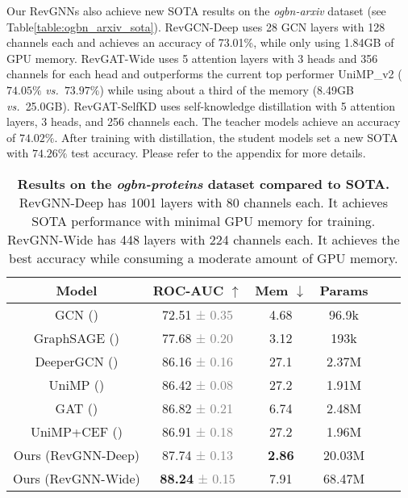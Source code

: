 \documentclass{article}
\newcommand{\vs}{\emph{vs.~}}
\newcommand{\tblLabel}{Table\xspace}
\begin{document}
Our RevGNNs also achieve new SOTA results on the \emph{ogbn-arxiv} dataset (see \tblLabel \ref{table:ogbn_arxiv_sota}). RevGCN-Deep uses 28 GCN \citep{kipf2017semi} layers with 128 channels each and achieves an accuracy of 73.01\%, while  only using 1.84GB of GPU memory.
RevGAT-Wide uses 5 attention layers with 3 heads and 356 channels for each head and outperforms the current top performer UniMP\_v2 \citep{shi2020masked} ($74.05\%$ \vs $73.97\%$) while using about a third of the memory (8.49GB \vs 25.0GB). RevGAT-SelfKD uses self-knowledge distillation \citep{Zhang2019be} with 5 attention layers, 3 heads, and 256 channels each. The teacher models achieve an accuracy of $74.02\%$. After training with distillation, the student models set a new SOTA with $74.26\%$ test accuracy. Please refer to the appendix for more details.

\begin{table}[t]
\vspace{-8pt}
\centering
\setlength{\tabcolsep}{1pt}
\caption{\textbf{Results on the \emph{ogbn-proteins} dataset compared to SOTA.} RevGNN-Deep has 1001 layers with 80 channels each. It achieves SOTA performance with minimal GPU memory for training. RevGNN-Wide has 448 layers with 224 channels each. It achieves the best accuracy while consuming a moderate amount of GPU memory.}
\vspace{2pt}
\begin{tabular}{cccccc}
\toprule
  \label{table:ogbn_proteins_sota}
  \centering
Model & ROC-AUC $\uparrow$
& Mem $\downarrow$
& Params \\
\midrule
GCN (\citeauthor{kipf2017semi}) & 72.51 \textcolor{gray}{\small{± 0.35}} & 4.68 
& 96.9k \\
GraphSAGE (\citeauthor{hamilton2017inductive}) & 77.68 \textcolor{gray}{\small{± 0.20}} & 3.12 
& 193k \\
DeeperGCN (\citeauthor{li2020deepergcn}) & 86.16 \textcolor{gray}{\small{± 0.16}} & 27.1
& 2.37M \\
UniMP (\citeauthor{shi2020masked}) & 86.42 \textcolor{gray}{\small{± 0.08}} & 27.2
& 1.91M \\
GAT (\citeauthor{veli2018gat}) & 86.82 \textcolor{gray}{\small{± 0.21}} & 6.74
& 2.48M \\
UniMP+CEF (\citeauthor{shi2020masked}) & 86.91 \textcolor{gray}{\small{± 0.18}} 
& 27.2
& 1.96M \\
\midrule
Ours (RevGNN-Deep)& 87.74 \textcolor{gray}{\small{± 0.13}} & \textbf{2.86} & 20.03M
\\
Ours (RevGNN-Wide) & \textbf{88.24} \textcolor{gray}{\small{± 0.15}} & 7.91 & 68.47M 
\\
\bottomrule
\end{tabular}
\end{table}
\end{document}

